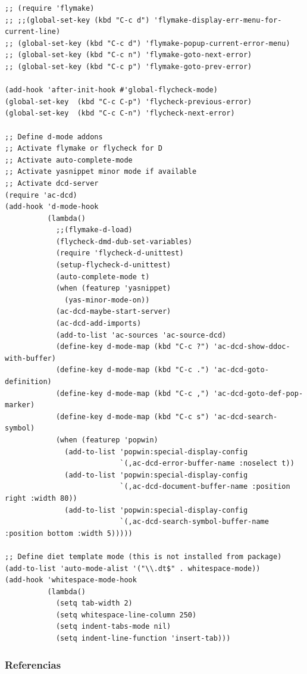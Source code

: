 \documentclass[12pt,spanish,]{article}
\begin{document}
\begin{verbatim}
;; (require 'flymake)
;; ;;(global-set-key (kbd "C-c d") 'flymake-display-err-menu-for-current-line)
;; (global-set-key (kbd "C-c d") 'flymake-popup-current-error-menu)
;; (global-set-key (kbd "C-c n") 'flymake-goto-next-error)
;; (global-set-key (kbd "C-c p") 'flymake-goto-prev-error)

(add-hook 'after-init-hook #'global-flycheck-mode)
(global-set-key  (kbd "C-c C-p") 'flycheck-previous-error)
(global-set-key  (kbd "C-c C-n") 'flycheck-next-error)

;; Define d-mode addons
;; Activate flymake or flycheck for D
;; Activate auto-complete-mode
;; Activate yasnippet minor mode if available
;; Activate dcd-server
(require 'ac-dcd)
(add-hook 'd-mode-hook
          (lambda()
            ;;(flymake-d-load)
            (flycheck-dmd-dub-set-variables)
            (require 'flycheck-d-unittest)
            (setup-flycheck-d-unittest)
            (auto-complete-mode t)
            (when (featurep 'yasnippet)
              (yas-minor-mode-on))
            (ac-dcd-maybe-start-server)
            (ac-dcd-add-imports)
            (add-to-list 'ac-sources 'ac-source-dcd)
            (define-key d-mode-map (kbd "C-c ?") 'ac-dcd-show-ddoc-with-buffer)
            (define-key d-mode-map (kbd "C-c .") 'ac-dcd-goto-definition)
            (define-key d-mode-map (kbd "C-c ,") 'ac-dcd-goto-def-pop-marker)
            (define-key d-mode-map (kbd "C-c s") 'ac-dcd-search-symbol)
            (when (featurep 'popwin)
              (add-to-list 'popwin:special-display-config
                           `(,ac-dcd-error-buffer-name :noselect t))
              (add-to-list 'popwin:special-display-config
                           `(,ac-dcd-document-buffer-name :position right :width 80))
              (add-to-list 'popwin:special-display-config
                           `(,ac-dcd-search-symbol-buffer-name :position bottom :width 5)))))

;; Define diet template mode (this is not installed from package)
(add-to-list 'auto-mode-alist '("\\.dt$" . whitespace-mode))
(add-hook 'whitespace-mode-hook
          (lambda()
            (setq tab-width 2)
            (setq whitespace-line-column 250)
            (setq indent-tabs-mode nil)
            (setq indent-line-function 'insert-tab)))
\end{verbatim}

\subsubsection{Referencias}\label{referencias}
\end{document}

